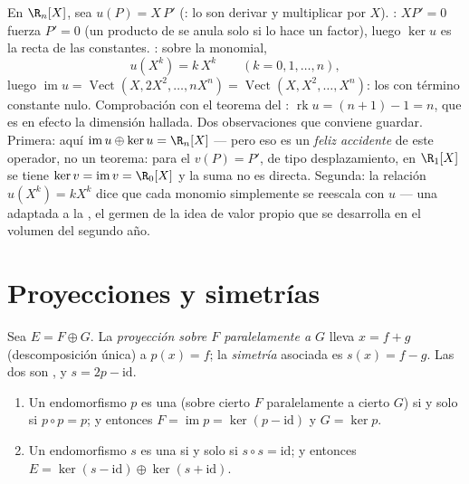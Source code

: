 \begin{example}
\label{ex:b1:linmaps:euler}
En $\R_n[X]$, sea $u(P) = X\,P'$ (: lo son derivar y
multiplicar por $X$). \emph{}: $XP' = 0$ fuerza $P' = 0$ (un
producto de  se anula solo si lo hace un factor), luego
$\ker u$ es la recta de las constantes. \emph{}: sobre la
 monomial,
\[
u(X^k) = k\,X^{k} \qquad (k = 0, 1, \dots, n),
\]
luego $\operatorname{im} u = \operatorname{Vect}(X, 2X^2, \dots,
nX^n) = \operatorname{Vect}(X, X^2, \dots, X^n)$: los  con
término constante nulo. Comprobación con el teorema del :
$\operatorname{rk} u = (n + 1) - 1 = n$, que es en efecto la
dimensión hallada. Dos observaciones que conviene guardar. Primera:
aquí $\operatorname{im} u \oplus \ker u = \R_n[X]$ --- pero eso es un
\emph{feliz accidente} de este operador, no un teorema: para el
$v(P) = P'$, de tipo desplazamiento, en $\R_1[X]$ se tiene
$\ker v = \operatorname{im} v = \R_0[X]$ y la suma no es directa.
Segunda: la relación $u(X^k) = kX^k$ dice que cada monomio
simplemente se reescala con $u$ --- una  adaptada a la
, el germen de la idea de valor propio que se desarrolla
en el volumen del segundo año.
\end{example}

\section{Proyecciones y simetrías}

\begin{definition}\label{def:b1:linmaps:projection}
Sea $E = F \oplus G$. La \emph{proyección sobre $F$ paralelamente a
$G$} lleva $x = f + g$ (descomposición única) a
$p(x) = f$; la \emph{simetría} asociada es
$s(x) = f - g$. Las dos son , y $s = 2p - \mathrm{id}$.
\end{definition}

\begin{theorem}\label{thm:b1:linmaps:projchar}
\begin{enumerate}
  \item Un endomorfismo $p$ es una  (sobre cierto $F$
        paralelamente a cierto $G$) si y solo si $p \circ p = p$; y
        entonces $F = \operatorname{im} p = \ker(p - \mathrm{id})$ y
        $G = \ker p$.
  \item Un endomorfismo $s$ es una  si y solo si
        $s \circ s = \mathrm{id}$; y entonces
        $E = \ker(s - \mathrm{id}) \oplus \ker(s + \mathrm{id})$.
\end{enumerate}
\end{theorem}

